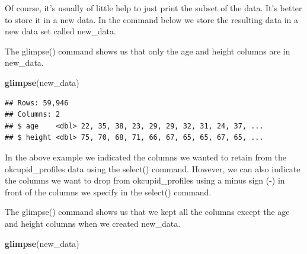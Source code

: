 \documentclass[
]{krantz}
\makeatletter
\newenvironment{Shaded}{\begin{snugshade}}{\end{snugshade}}
\newcommand{\KeywordTok}[1]{\textcolor[rgb]{0.27,0.27,0.27}{\textbf{#1}}}
\newcommand{\NormalTok}[1]{#1}
\newcommand{\OperatorTok}[1]{\textcolor[rgb]{0.43,0.43,0.43}{\textbf{#1}}}
\newcommand{\StringTok}[1]{\textcolor[rgb]{0.5,0.5,0.5}{#1}}
\newenvironment{kframe}{%
\medskip{}
\setlength{\fboxsep}{.8em}
 \def\at@end@of@kframe{}%
 \ifinner\ifhmode%
  \def\at@end@of@kframe{\end{minipage}}%
  \begin{minipage}{\columnwidth}%
 \fi\fi%
 \def\FrameCommand##1{\hskip\@totalleftmargin \hskip-\fboxsep
 \colorbox{shadecolor}{##1}\hskip-\fboxsep
     \hskip-\linewidth \hskip-\@totalleftmargin \hskip\columnwidth}%
 \MakeFramed {\advance\hsize-\width
   \@totalleftmargin\z@ \linewidth\hsize
   \@setminipage}}%
 {\par\unskip\endMakeFramed%
 \at@end@of@kframe}
\renewenvironment{Shaded}{\begin{kframe}}{\end{kframe}}
\makeatother
\begin{document}
Of course, it's usually of little help to just print the subset of the data. It's better to store it in a new data. In the command below we store the resulting data in a new data set called new\_data.

\begin{Shaded}
\end{Shaded}

The glimpse() command shows us that only the age and height columns are in new\_data.

\begin{Shaded}
\begin{Highlighting}[]
\KeywordTok{glimpse}\NormalTok{(new_data)}
\end{Highlighting}
\end{Shaded}

\begin{verbatim}
## Rows: 59,946
## Columns: 2
## $ age    <dbl> 22, 35, 38, 23, 29, 29, 32, 31, 24, 37, ...
## $ height <dbl> 75, 70, 68, 71, 66, 67, 65, 65, 67, 65, ...
\end{verbatim}

In the above example we indicated the columns we wanted to retain from the okcupid\_profiles data using the select() command. However, we can also indicate the columns we want to drop from okcupid\_profiles using a minus sign (-) in front of the columns we specify in the select() command.

\begin{Shaded}
\end{Shaded}

The glimpse() command shows us that we kept all the columns except the age and height columns when we created new\_data.

\begin{Shaded}
\begin{Highlighting}[]
\KeywordTok{glimpse}\NormalTok{(new_data)}
\end{Highlighting}
\end{Shaded}
\end{document}
